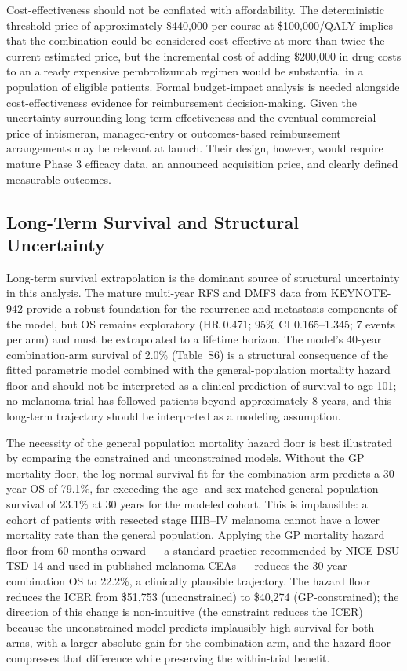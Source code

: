 \documentclass[12pt,a4paper]{article}
\begin{document}
Cost-effectiveness should not be conflated with affordability. The deterministic threshold price of approximately \$440,000 per course at \$100,000/QALY implies that the combination could be considered cost-effective at more than twice the current estimated price, but the incremental cost of adding \$200,000 in drug costs to an already expensive \mbox{pembrolizumab} regimen would be substantial in a population of eligible patients. Formal budget-impact analysis is needed alongside cost-effectiveness evidence for reimbursement decision-making. Given the uncertainty surrounding long-term effectiveness and the eventual commercial price of intismeran, managed-entry or outcomes-based reimbursement arrangements may be relevant at launch. Their design, however, would require mature Phase 3 efficacy data, an announced acquisition price, and clearly defined measurable outcomes.

\subsection{Long-Term Survival and Structural Uncertainty}

Long-term survival extrapolation is the dominant source of structural uncertainty in this analysis. The mature multi-year RFS and DMFS data from \mbox{KEYNOTE-942} provide a robust foundation for the recurrence and metastasis components of the model, but OS remains exploratory (HR 0.471; 95\% CI 0.165--1.345; 7 events per arm) and must be extrapolated to a lifetime horizon. The model's 40-year combination-arm survival of 2.0\% (Table~S6) is a structural consequence of the fitted parametric model combined with the general-population mortality hazard floor and should not be interpreted as a clinical prediction of survival to age 101; no melanoma trial has followed patients beyond approximately 8 years, and this long-term trajectory should be interpreted as a modeling assumption.

The necessity of the general population mortality hazard floor is best illustrated by comparing the constrained and unconstrained models. Without the GP mortality floor, the log-normal survival fit for the combination arm predicts a 30-year OS of 79.1\%, far exceeding the age- and sex-matched general population survival of 23.1\% at 30 years for the modeled cohort. This is implausible: a cohort of patients with resected stage IIIB--IV melanoma cannot have a lower mortality rate than the general population. Applying the GP mortality hazard floor from 60 months onward --- a standard practice recommended by NICE DSU TSD 14 \cite{latimer2011} and used in published melanoma CEAs \cite{zhang2023} --- reduces the 30-year combination OS to 22.2\%, a clinically plausible trajectory. The hazard floor reduces the ICER from \$51,753 (unconstrained) to \$40,274 (GP-constrained); the direction of this change is non-intuitive (the constraint reduces the ICER) because the unconstrained model predicts implausibly high survival for both arms, with a larger absolute gain for the combination arm, and the hazard floor compresses that difference while preserving the within-trial benefit.
\end{document}
